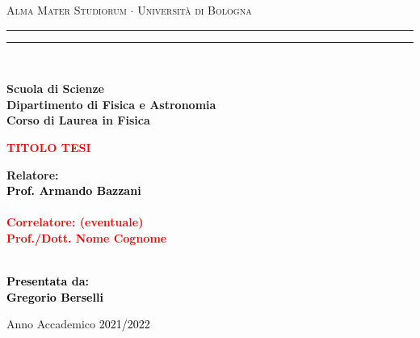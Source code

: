 \documentclass[12pt,a4paper]{report}
\begin{document}
\begin{titlepage}
%
%
%
%
\begin{center}
{{\Large{\textsc{Alma Mater Studiorum $\cdot$ Universit\`a di Bologna}}}} 
\rule[0.1cm]{15.8cm}{0.1mm}
\rule[0.5cm]{15.8cm}{0.6mm}
\\\vspace{3mm}

{\small{\bf Scuola di Scienze \\ 
Dipartimento di Fisica e Astronomia\\
Corso di Laurea in Fisica}}

\end{center}

\vspace{23mm}

\begin{center}\textcolor{red}{
%
%
{\LARGE{\bf TITOLO TESI}}\\
}\end{center}

\vspace{50mm} \par \noindent

\begin{minipage}[t]{0.47\textwidth}
%
%
{\large{\bf Relatore: \vspace{2mm}\\\textcolor{black}{
Prof. Armando Bazzani}\\\\
%
%
%
\textcolor{red}{
\bf Correlatore: (eventuale)
\vspace{2mm}\\
Prof./Dott. Nome Cognome\\\\}}}
\end{minipage}
%
\hfill
%
\begin{minipage}[t]{0.47\textwidth}\raggedleft \textcolor{black}{
{\large{\bf Presentata da:
\vspace{2mm}\\
%
%
Gregorio Berselli}}}
\end{minipage}

\vspace{40mm}

\begin{center}
%
%
Anno Accademico \textcolor{black}{ 2021/2022}
\end{center}

\end{titlepage}
\end{document}
